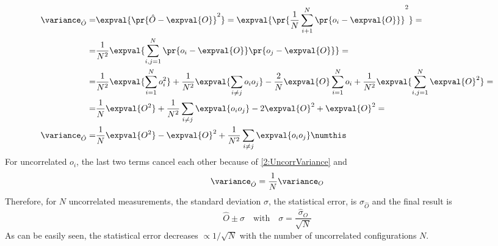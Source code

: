 \begin{align*}
    \variance_{\hat{O}} =& \expval{\pr{\hat{O}-\expval{O}}^2} = \expval{\pr{\frac1N\sum_{i+1}^N\pr{o_i-\expval{O}}}^2} = \\
    =& \frac1{N^2}\expval{\sum_{i,j=1}^N\pr{o_i-\expval{O}}\pr{o_j-\expval{O}}} = \\
    =& \frac1{N^2}\expval{\sum_{i=1}^No_i^2} + \frac1{N^2}\expval{\sum_{i\neq j}o_io_j} -\frac2N\expval{O}\sum_{i=1}^No_i +\frac1{N^2}\expval{\sum_{i,j=1}^N\expval{O}^2} =\\
    =& \frac1N\expval{O^2} +\frac1{N^2}\sum_{i\neq j}\expval{o_io_j} -2\expval{O}^2 +\expval{O}^2 = \\
    \variance_{\hat{O}} =& \frac1N\expval{O^2} -\expval{O}^2 +\frac1{N^2}\sum_{i\neq j}\expval{o_io_j} \numthis\label{2:CorrVarMean}
\end{align*}
For uncorrelated $o_i$, the last two terms cancel each other because of \eqref{2:UncorrVariance} and
\begin{equation}
    \variance_{\hat{O}} = \frac1N\variance_O \label{2:VarianceRelation}
\end{equation}
Therefore, for $N$ uncorrelated measurements, the standard deviation $\sigma$, \ie the statistical error, is $\sigma_{\hat{O}}$ and the final result is
\begin{equation}
    \hat{O}\pm\sigma \quad \text{with} \quad \sigma=\frac{\hat{\sigma}_O}{\sqrt{N}} \label{2:FinalMeasureUncorr}
\end{equation}
As can be easily seen, the statistical error decreases $\varpropto1/\sqrt{N}$ with the number of uncorrelated configurations $N$.
